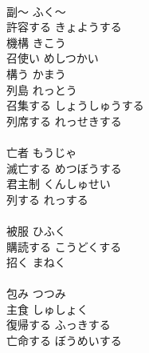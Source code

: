 \documentclass[8pt]{extreport}
\begin{document}
\begin{CJK}{UTF8}{min}
\\	副～	ふく～	
\\	許容する	きょようする	
\\	機構	きこう	
\\	召使い	めしつかい	
\\	構う	かまう	
\\	列島	れっとう	
\\	召集する	しょうしゅうする	
\\	列席する	れっせきする	
\\	[漢語]
\\	亡者	もうじゃ	
\\	滅亡する	めつぼうする	
\\	君主制	くんしゅせい	
\\	列する	れっする	
\\	[和語]
\\	被服	ひふく	
\\	購読する	こうどくする	
\\	招く	まねく	
\\	[和語]
\\	包み	つつみ	
\\	主食	しゅしょく	
\\	復帰する	ふっきする	
\\	亡命する	ぼうめいする	
\end{CJK}
\end{document}
